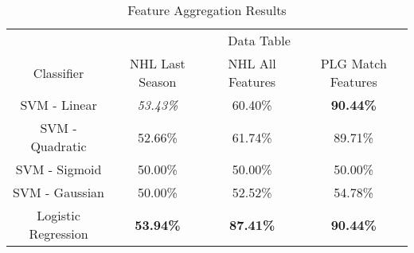 \documentclass[conference]{IEEEtran}
\begin{document}
\begin{table}[htdp]
\caption{Feature Aggregation Results}
\begin{center}
\begin{tabular}{|c|c|c|c|}
& \multicolumn{3}{c|}{Data Table} \\
Classifier & NHL Last Season  & NHL All Features  & PLG Match Features \\
SVM - Linear & \textit{53.43\%} & 60.40\% & \textbf{90.44\%} \\
SVM - Quadratic & 52.66\% & 61.74\% & 89.71\% \\
SVM - Sigmoid & 50.00\% & 50.00\% & 50.00\% \\
SVM - Gaussian & 50.00\% & 52.52\% & 54.78\% \\
Logistic Regression & \textbf{53.94\%} & \textbf{87.41\%} & \textbf{90.44\%} \\
\end{tabular}
\end{center}
\label{table:feature-agg}
\end{table}%


\begin{table}[htbp]
\caption{Comparison of Classification Accuracy and F-Measure for Feature and Score Aggregation}
\centering
{}
\label{table:compare-all}
\end{table}
\end{document}
